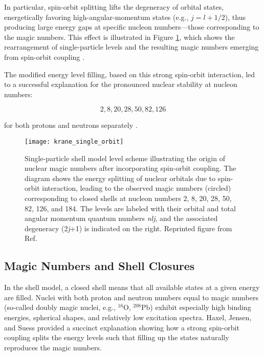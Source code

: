 In particular, spin-orbit splitting lifts the degeneracy of orbital states, energetically favoring high-angular-momentum states (e.g., $j=l+1/2$), thus producing large energy gaps at specific nucleon numbers—those corresponding to the magic numbers. This effect is illustrated in Figure \ref{fig:magic_numbers}, which shows the rearrangement of single-particle levels and the resulting magic numbers emerging from spin-orbit coupling \cite{krane_introductory_1988}.

The modified energy level filling, based on this strong spin-orbit interaction, led to a successful explanation for the pronounced nuclear stability at nucleon numbers:

\[2,8,20,28,50,82,126\]

for both protons and neutrons separately \cite{mayer_shell_1968}.

\begin{figure}
	\centering
	\texttt{[image: krane\_single\_orbit]}
	\caption[Shell model level scheme with spin-orbit splitting]{Single-particle shell model level scheme illustrating the origin of nuclear magic numbers after incorporating spin-orbit coupling. The diagram shows the energy splitting of nuclear orbitals due to spin-orbit interaction, leading to the observed magic numbers (circled) corresponding to closed shells at nucleon numbers 2, 8, 20, 28, 50, 82, 126, and 184. The levels are labeled with their orbital and total angular momentum quantum numbers \emph{nlj}, and the associated degeneracy (2\emph{j}+1) is indicated on the right. Reprinted figure from Ref. \cite{krane_introductory_1988}}
	\label{fig:magic_numbers}
\end{figure}


\subsection{Magic Numbers and Shell Closures}

In the shell model, a closed shell means that all available states at a given energy are filled. Nuclei with both proton and neutron numbers equal to magic numbers (so-called doubly magic nuclei, e.g., $^{16}$O, $^{208}$Pb) exhibit especially high binding energies, spherical shapes, and relatively low excitation spectra. Haxel, Jensen, and Suess \cite{haxel_magic_nodate} provided a succinct explanation showing how a strong spin-orbit coupling splits the energy levels such that filling up the states naturally reproduces the magic numbers.


